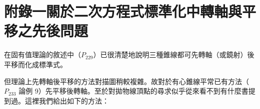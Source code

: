 
\section*{附錄一\quad 關於二次方程式標準化中轉軸與平移之先後問題}
\label{sec:b4s-a1}

在固有值理論的敘述中（$P_{229}$）已很清楚地說明三種錐線都可先轉軸（或鏡射）後平移而化成標準式。

但理論上先轉軸後平移的方法對描圖稍較複雜。故對於有心錐線平常已有方法（$P_{233}$ 論例 9）先平移後轉軸。至於對拋物線頂點的尋求似乎從來看不到有什麼書提到過。這裡我們給出如下的方法：

